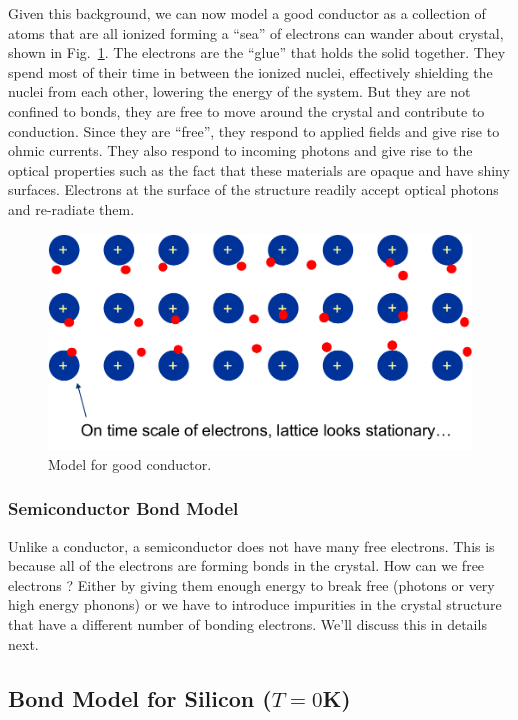 Given this background, we can now model a good conductor as a collection of atoms that are all ionized forming a  “sea” of electrons can wander about crystal, shown in Fig.~\ref{fig:slide25}.   The electrons are the “glue” that holds the solid together.  They spend most of their time in between the ionized nuclei, effectively shielding the nuclei from each other, lowering the energy of the system.  But they are not confined to bonds, they are free to move around the crystal and contribute to conduction.  Since they are “free”, they respond to applied fields and give rise to ohmic currents.  They also respond to incoming photons and give rise to the optical properties such as the fact that these materials are opaque and have shiny surfaces.   Electrons at the surface of the structure readily accept optical photons and re-radiate them.
 


\begin{figure}
\begin{center}
\includegraphics[width=.5\columnwidth]{slide25}
\end{center}
\caption{Model for good conductor. } \label{fig:slide25}
\end{figure}

 





\subsubsection{Semiconductor Bond Model}

Unlike a conductor, a semiconductor does not have many free electrons.  This is because all of the electrons are forming bonds in the crystal.  How can we free electrons ?  Either by giving them enough energy to break free (photons or very high energy phonons) or we have to introduce impurities in the crystal structure that have a different number of bonding electrons.  We'll discuss this in details next.

\subsection{Bond Model for Silicon ($T=0$K)}

